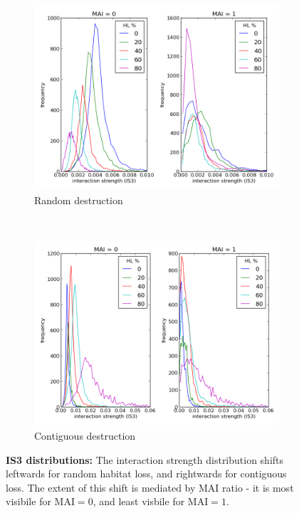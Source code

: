 \begin{figure} 
		\centering      
        \begin{subfigure}[b]{0.5\textwidth}
                \includegraphics[width=\textwidth]{"random_plots/interaction_strength_distributions"}
                \caption{Random destruction}
        \end{subfigure}%
        ~
        \begin{subfigure}[b]{0.5\textwidth}
                \includegraphics[width=\textwidth]{"contiguous_plots/interaction_strength_distributions"}
                \caption{Contiguous destruction}
        \end{subfigure}
        \caption{\textbf{IS3 distributions:} The interaction strength distribution shifts leftwards for random habitat loss, and rightwards for contiguous loss. The extent of this shift is mediated by MAI ratio - it is most visibile for MAI$=0$, and least visbile for MAI$=1$.}\label{fig:IS3_distributions}
\end{figure}

